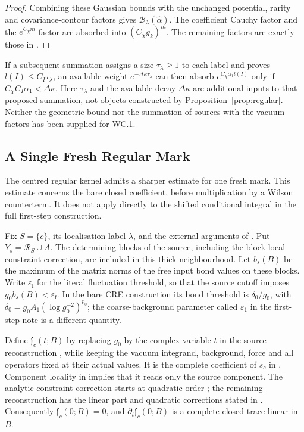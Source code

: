 \documentclass[11pt]{preprint}
\numberwithin{equation}{section}
\begin{document}
\begin{proof}
Combining these Gaussian bounds with the unchanged potential, rarity and covariance-contour factors gives $\mathcal B_\lambda(\widehat\alpha)$. The coefficient Cauchy factor and the $e^{C_{\chi}m}$ factor are absorbed into $(C_{\chi}g_k)^m$. The remaining factors are exactly those in .
\end{proof}

If a subsequent summation assigns a size $\tau_\lambda \geq 1$ to each label and proves $l(I) \leqslant C_I\tau_\lambda$, an available weight $e^{-\Delta\kappa\tau_\lambda}$ can then absorb $e^{C_{\chi}\alpha_1l(I)}$ only if $C_{\chi}C_I\alpha_1<\Delta\kappa$. Here $\tau_\lambda$ and the available decay $\Delta\kappa$ are additional inputs to that proposed summation, not objects constructed by Proposition~\ref{prop:regular}. Neither the geometric bound nor the summation of sources with the vacuum factors has been supplied for WC.1.

\subsection{A Single Fresh Regular Mark}
\label{sec:freshmark}

The centred regular kernel admits a sharper estimate for one fresh mark. This estimate concerns the bare closed coefficient, before multiplication by a Wilson counterterm. It does not apply directly to the shifted conditional integral in the full first-step construction.

Fix $S=\{c\}$, its localisation label $\lambda$, and the external arguments of . Put $Y_s=\mathcal R_S\cup A$. The determining blocks of the source, including the block-local constraint correction, are included in this thick neighbourhood. Let $b_s(B)$ be the maximum of the matrix norms of the free input bond values on these blocks. Write $\varepsilon_{\mathrm f}$ for the literal fluctuation threshold, so that the source cutoff imposes $g_0 b_s(B)<\varepsilon_{\mathrm f}$. In the bare CRE construction its bond threshold is $\delta_0/g_0$, with $\delta_0=g_0A_1(\log g_0^{-2})^{p_0}$; the coarse-background parameter called $\varepsilon_1$ in the first-step note is a different quantity.

Define $\mathfrak f_c(t;B)$ by replacing $g_0$ by the complex variable $t$ in the source reconstruction , while keeping the vacuum integrand, background, force and all operators fixed at their actual values. It is the complete coefficient of $s_c$ in . Component locality in \cite[eqs.~(1.9)--(1.10)]{RG2} implies that it reads only the source component. The analytic constraint correction starts at quadratic order \cite[p.~267]{RG1}; the remaining reconstruction has the linear part and quadratic corrections stated in \cite[eqs.~(1.14), (1.16)--(1.20)]{RG2}. Consequently $\mathfrak f_c(0;B)=0$, and $\partial_t\mathfrak f_c(0;B)$ is a complete closed trace linear in $B$.
\end{document}
